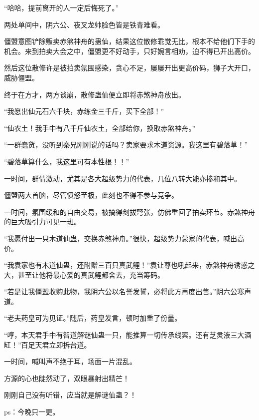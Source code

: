 \begin{this_body}
“哈哈，提前离开的人一定后悔死了。”

两处单间中，阴六公、夜叉龙帅脸色皆是铁青难看。

僵盟意图铲除贩卖赤煞神舟的蛊仙，结果这位散修乖觉无比，根本不给他们下手的机会。来到拍卖大会之中，僵盟更不好动手，只好婉言相劝，迫不得已开出高价。

然后这位散修许是被拍卖氛围感染，贪心不足，屡屡开出更高价码，狮子大开口，威胁僵盟。

终于在方才，两方谈崩，散修蛊仙便立即将赤煞神舟放出。

“我愿出仙元石六千块，赤练金三千斤，买下全部！”

“仙农土！我手中有八千斤仙农土，全部给你，换取赤煞神舟。”

“一群蠢货，没听到秦兄刚刚说的话吗？卖家要求木道资源。我这里有碧落草！”

“碧落草算什么，我这里可有本性根！！”

一时间，群情激动，尤其是各大超级势力的代表，几位八转大能亦掺和其中。

僵盟两大首脑，尽管愤怒至极，此刻也不得不参与竞争。

一时间，氛围缓和的自由交易，被搞得剑拔弩张，仿佛重回了拍卖环节。赤煞神舟的巨大吸引力可见一斑。

“我愿付出一只木道仙蛊，交换赤煞神舟。”很快，超级势力蒙家的代表，喊出高价。

“我袁家也有木道仙蛊，还附赠三百只真武鲤！”袁让尊也吼起来，赤煞神舟诱惑之大，甚至让他将最心爱的真武鲤都舍去，充当筹码。

“若是让我僵盟收购此物，我阴六公以名誉发誓，必将此方再度出售。”阴六公寒声道。

“老夫药皇可为见证。”随后，药皇发言，顿时加重了份量。

“哼，本天君手中有智道解谜仙蛊一只，能推算一切传承线索。还有芝灵液三大酒缸！”百足天君立即拆台道。

一时间，喊叫声不绝于耳，场面一片混乱。

方源的心也陡然动了，双眼暴射出精芒！

刚刚自己没有听错，应当就是解谜仙蛊？！

ps：今晚只一更。

\end{this_body}

